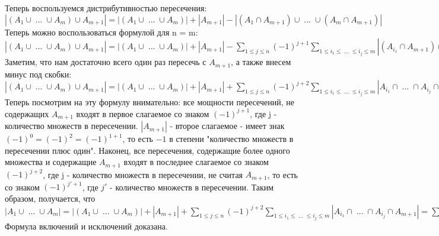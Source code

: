 Теперь воспользуемся дистрибутивностью пересечения:\\
$|(A_1 \cup \; ... \; \cup A_m) \cup A_{m + 1}| = |(A_1 \cup \; ... \; \cup A_m)| + |A_{m + 1}| - |(A_1 \cap A_{m + 1}) \cup \; ... \; \cup (A_m \cap A_{m + 1})|$\\
Теперь можно воспользоваться формулой для n = m:
$|(A_1 \cup \; ... \; \cup A_m) \cup A_{m + 1}| = |(A_1 \cup \; ... \; \cup A_m)| + |A_{m + 1}| - \sum\limits_{1 \leq j \leq n} (-1)^{j + 1} \sum \limits_{1 \leq i_1 \leq \; ... \; \leq i_j \leq m} |(A_{i_1} \cap A_{m + 1}) \cap \; ... \; (\cap A_{i_j} \cap A_{m + 1})|$\\
Заметим, что нам достаточно всего один раз пересечь с $A_{m + 1}$, а также внесем минус под скобки:\\
$|(A_1 \cup \; ... \; \cup A_m) \cup A_{m + 1}| = |(A_1 \cup \; ... \; \cup A_m)| + |A_{m + 1}| + \sum\limits_{1 \leq j \leq n} (-1)^{j + 2} \sum \limits_{1 \leq i_1 \leq \; ... \; \leq i_j \leq m} |A_{i_1} \cap \; ... \; \cap A_{i_j} \cap A_{m + 1}|$\\
Теперь посмотрим на эту формулу внимательно: все мощности пересечений, не содержащих $A_{m + 1}$ входят в первое слагаемое со знаком $(-1)^{j + 1}$, где j - количество множеств в пересечении. $|A_{m + 1}|$ - второе слагаемое - имеет знак $(-1)^0 = (-1)^2 = (-1)^{1 + 1}$, то есть $-1$ в степени "количество множеств в пересечении плюс один". Наконец, все пересечения, содержащие более одного множества и содержащие $A_{m + 1}$ входят в последнее слагаемое со знаком $(-1)^{j + 2}$, где j - количество множеств в пересечении, не считая $A_{m + 1}$, то есть со знаком $(-1)^{j' + 1}$, где $j'$ - количество множеств в пересечении. Таким образом, получается, что \\
$|A_1 \cup \; ... \; \cup A_m| = |(A_1 \cup \; ... \; \cup A_m)| + |A_{m + 1}| + \sum\limits_{1 \leq j \leq n} (-1)^{j + 2} \sum \limits_{1 \leq i_1 \leq \; ... \; \leq i_j \leq m} |A_{i_1} \cap \; ... \; \cap A_{i_j} \cap A_{m + 1}| = \sum\limits_{1 \leq j \leq n} (-1)^{j + 1} \sum \limits_{1 \leq i_1 \leq \; ... \; \leq i_j \leq n} |A_{i_1} \cap \; ... \; \cap A_{i_j}|$\\
Формула включений и исключений доказана.